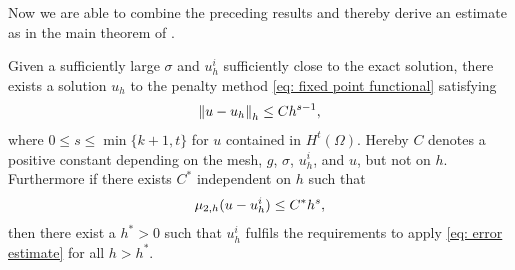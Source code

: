 
Now we are able to combine the preceding results and thereby derive an estimate as in the main theorem of \cite{BGN+2011}.
\begin{theorem}\label{main result}
	Given a sufficiently large $\sigma$ and $u_h^i$ sufficiently close to the exact solution, there exists a solution $u_h$ to the penalty method \eqref{eq: fixed point functional} satisfying
	\begin{align}
		\left\lVert u-u_h \right\rVert_{h} \leq C h^{s-1}, \label{eq: error estimate}
	\end{align}
	where $0 \leq s \leq \min\{k+1, t\}$ for $u$ contained in $H^t(\Omega)$. Hereby $C$ denotes a positive constant depending on the mesh, $g$, $\sigma$, $u^i_h$, and $u$, but not on $h$.\\
	Furthermore if there exists $C^*$ independent on $h$ such that
	\begin{align}
		\mu_{2,h}(u-u_h^i) \leq C^* h^{s}, \label{eq: estimate error}
	\end{align}
	then there exist a $h^*> 0$ such that $u_h^i$ fulfils the requirements to apply \eqref{eq: error estimate} for all $h > h^*$.
	
\end{theorem}
